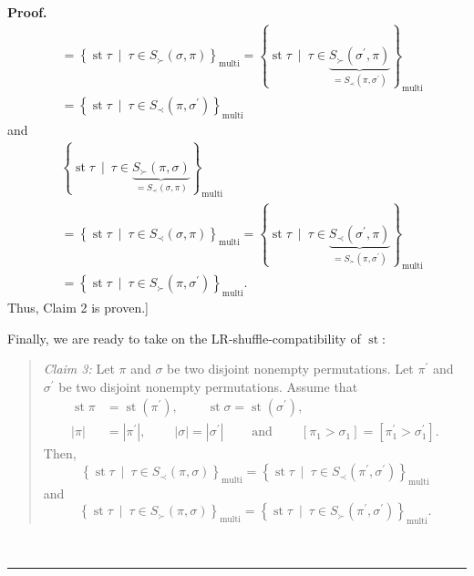 \documentclass[numbers=enddot,12pt,final,onecolumn,notitlepage]{scrartcl}%
\theoremstyle{definition}
\newenvironment{statement}{\begin{quote}}{\end{quote}}
\newenvironment{proof}[1][Proof]{\noindent\textbf{#1.} }{\ \rule{0.5em}{0.5em}}
\begin{document}
\begin{proof}
\begin{align*}
&  =\left\{  \operatorname{st} \tau   \ \mid\ \tau\in S_{\succ
}\left(  \sigma,\pi\right)  \right\}  _{\operatorname*{multi}}=\left\{
\operatorname{st} \tau   \ \mid\ \tau\in\underbrace{S_{\succ
}\left(  \sigma^{\prime},\pi\right)  }_{=S_{\prec}\left(  \pi,\sigma^{\prime
}\right)  }\right\}  _{\operatorname*{multi}}\\
&  =\left\{  \operatorname{st} \tau   \ \mid\ \tau\in S_{\prec
}\left(  \pi,\sigma^{\prime}\right)  \right\}  _{\operatorname*{multi}}%
\end{align*}
and%
\begin{align*}
&  \left\{  \operatorname{st} \tau   \ \mid\ \tau\in
\underbrace{S_{\succ}\left(  \pi,\sigma\right)  }_{=S_{\prec}\left(
\sigma,\pi\right)  }\right\}  _{\operatorname*{multi}}\\
&  =\left\{  \operatorname{st} \tau   \ \mid\ \tau\in S_{\prec
}\left(  \sigma,\pi\right)  \right\}  _{\operatorname*{multi}}=\left\{
\operatorname{st} \tau   \ \mid\ \tau\in\underbrace{S_{\prec
}\left(  \sigma^{\prime},\pi\right)  }_{=S_{\succ}\left(  \pi,\sigma^{\prime
}\right)  }\right\}  _{\operatorname*{multi}}\\
&  =\left\{  \operatorname{st} \tau   \ \mid\ \tau\in S_{\succ
}\left(  \pi,\sigma^{\prime}\right)  \right\}  _{\operatorname*{multi}}.
\end{align*}
Thus, Claim 2 is proven.]

Finally, we are ready to take on the LR-shuffle-compatibility of
$\operatorname{st}$:

\begin{statement}
\textit{Claim 3:} Let $\pi$ and $\sigma$ be two disjoint nonempty
permutations. Let $\pi^{\prime}$ and $\sigma^{\prime}$ be two disjoint
nonempty permutations. Assume that%
\begin{align*}
\operatorname{st} \pi    &  =\operatorname{st}\left(
\pi^{\prime}\right)  ,\ \ \ \ \ \ \ \ \ \ \operatorname{st}
\sigma  =\operatorname{st}\left(  \sigma^{\prime}\right)  ,\\
\left\vert \pi\right\vert  &  =\left\vert \pi^{\prime}\right\vert
,\ \ \ \ \ \ \ \ \ \ \left\vert \sigma\right\vert =\left\vert \sigma^{\prime
}\right\vert \ \ \ \ \ \ \ \ \ \ \text{and}\ \ \ \ \ \ \ \ \ \ \left[  \pi
_{1}>\sigma_{1}\right]  =\left[  \pi_{1}^{\prime}>\sigma_{1}^{\prime}\right]
.
\end{align*}
Then,
\[
\left\{  \operatorname{st} \tau   \ \mid\ \tau\in S_{\prec
}\left(  \pi,\sigma\right)  \right\}  _{\operatorname*{multi}}=\left\{
\operatorname{st} \tau   \ \mid\ \tau\in S_{\prec}\left(
\pi^{\prime},\sigma^{\prime}\right)  \right\}  _{\operatorname*{multi}}%
\]
and%
\[
\left\{  \operatorname{st} \tau   \ \mid\ \tau\in S_{\succ
}\left(  \pi,\sigma\right)  \right\}  _{\operatorname*{multi}}=\left\{
\operatorname{st} \tau   \ \mid\ \tau\in S_{\succ}\left(
\pi^{\prime},\sigma^{\prime}\right)  \right\}  _{\operatorname*{multi}}.
\]


\end{statement}
\end{proof}
\end{document}
